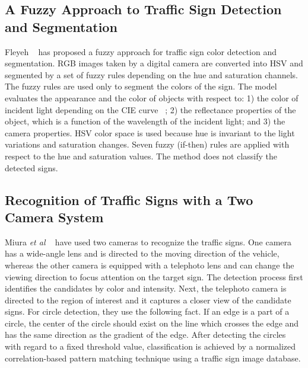 \documentclass[review,number]{elsarticle}
\begin{document}
\subsection{A Fuzzy Approach to Traffic Sign Detection and Segmentation}
Fleyeh ~\cite{signbib13} has proposed a fuzzy approach for traffic sign color detection and segmentation. RGB images taken by a digital camera are converted into HSV and segmented by a set of fuzzy rules depending on the hue and saturation channels. The fuzzy rules are used only to segment the colors of the sign. The model evaluates the appearance and the color of objects with respect to: 1) the color of incident light depending on the CIE curve ~\cite{signbib25}; 2) the reflectance properties of the object, which is a function of the wavelength of the incident light; and 3) the camera properties. HSV color space is used because hue is invariant to the light variations and saturation changes. Seven fuzzy (if-then) rules are applied with respect to the hue and saturation values. The method does not classify the detected signs. 

\subsection{Recognition of Traffic Signs with a Two Camera System}
Miura \textit{et al} ~\cite{signbib16} have used two cameras to recognize the traffic signs. One camera has a wide-angle lens and is directed to the moving direction of the vehicle, whereas the other camera is equipped with a telephoto lens and can change the viewing direction to focus attention on the target sign. The detection process first identifies the candidates by color and intensity. Next, the telephoto camera is directed to the region of interest and it captures a closer view of the candidate signs. For circle detection, they use the following fact. If an edge is a part of a circle, the center of the circle should exist on the line which crosses the edge and has the same direction as the gradient of the edge. After detecting the circles with regard to a fixed threshold value, classification is achieved by a normalized correlation-based pattern matching technique using a traffic sign image database. 
\end{document}
